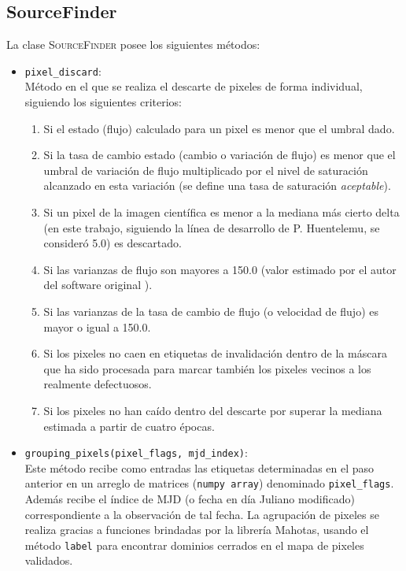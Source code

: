 \subsection{SourceFinder}
La clase \textsc{SourceFinder} posee los siguientes m\'etodos:
\begin{itemize}
\item \texttt{pixel\_discard}:\\
M\'etodo en el que se realiza el descarte de pixeles de forma individual, siguiendo los siguientes criterios:
\begin{enumerate}
\item Si el estado (flujo) calculado para un pixel es menor que el umbral dado.
\item Si la tasa de cambio estado (cambio o variaci\'on de flujo) es menor que el umbral de variaci\'on de flujo multiplicado por el nivel de saturaci\'on alcanzado en esta variaci\'on (se define una tasa de saturaci\'on \textit{aceptable}).
\item Si un pixel de la imagen cient\'ifica es menor a la mediana m\'as cierto delta (en este trabajo, siguiendo la l\'inea de desarrollo de P. Huentelemu, se consider\'o 5.0) es descartado.
\item Si las varianzas de flujo son mayores a 150.0 (valor estimado por el autor del software original \cite{huentelemu}).
\item Si las varianzas de la tasa de cambio de flujo (o velocidad de flujo) es mayor o igual a 150.0.
\item Si los pixeles no caen en etiquetas de invalidaci\'on dentro de la m\'ascara que ha sido procesada para marcar tambi\'en los pixeles vecinos a los realmente defectuosos.
\item Si los pixeles no han ca\'ido dentro del descarte por superar la mediana estimada a partir de cuatro \'epocas. 
\end{enumerate}
\item \texttt{grouping\_pixels(pixel\_flags, mjd\_index)}:\\
Este m\'etodo recibe como entradas las etiquetas determinadas en el paso anterior en un arreglo de matrices (\texttt{numpy array}) denominado \texttt{pixel\_flags}. Adem\'as recibe el \'indice de MJD (o fecha en d\'ia Juliano modificado) correspondiente a la observaci\'on de tal fecha.
La agrupaci\'on de pixeles se realiza gracias a funciones brindadas por la librer\'ia \textsf{Mahotas}, usando el m\'etodo \texttt{label} para encontrar dominios cerrados en el mapa de pixeles validados.
\bigskip


\end{itemize}
